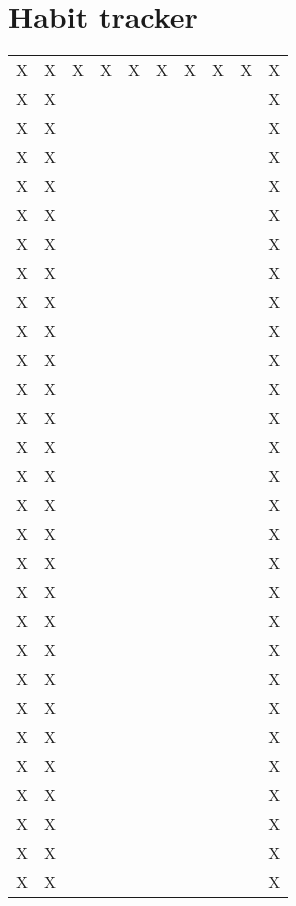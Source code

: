 \documentclass[10pt,a4paper]{article}
\begin{document}
\section{Habit tracker}
\begin{table}[htp]
\begin{tabular}{llllllllll}
X & X & X & X & X & X & X & X & X & X \\
X & X &   &   &   &   &   &   &   & X \\
X & X &   &   &   &   &   &   &   & X \\
X & X &   &   &   &   &   &   &   & X \\
X & X &   &   &   &   &   &   &   & X \\
X & X &   &   &   &   &   &   &   & X \\
X & X &   &   &   &   &   &   &   & X \\
X & X &   &   &   &   &   &   &   & X \\
X & X &   &   &   &   &   &   &   & X \\
X & X &   &   &   &   &   &   &   & X \\
X & X &   &   &   &   &   &   &   & X \\
X & X &   &   &   &   &   &   &   & X \\
X & X &   &   &   &   &   &   &   & X \\
X & X &   &   &   &   &   &   &   & X \\
X & X &   &   &   &   &   &   &   & X \\
X & X &   &   &   &   &   &   &   & X \\
X & X &   &   &   &   &   &   &   & X \\
X & X &   &   &   &   &   &   &   & X \\
X & X &   &   &   &   &   &   &   & X \\
X & X &   &   &   &   &   &   &   & X \\
X & X &   &   &   &   &   &   &   & X \\
X & X &   &   &   &   &   &   &   & X \\
X & X &   &   &   &   &   &   &   & X \\
X & X &   &   &   &   &   &   &   & X \\
X & X &   &   &   &   &   &   &   & X \\
X & X &   &   &   &   &   &   &   & X \\
X & X &   &   &   &   &   &   &   & X \\
X & X &   &   &   &   &   &   &   & X \\
X & X &   &   &   &   &   &   &   & X \\

\end{tabular}
\end{table}
\end{document}
